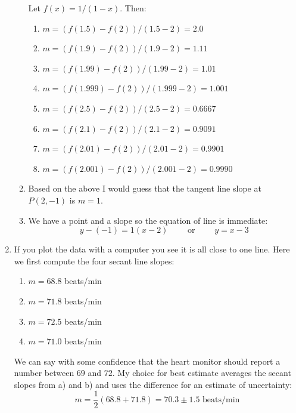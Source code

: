\documentclass[11pt]{amsart}
\begin{document}
\begin{enumerate}
\begin{enumerate}
    Let $f(x) = 1/(1-x)$.  Then:
        \renewcommand{\labelenumiii}{(\roman{enumiii})}
        \begin{enumerate}
        \item $m = (f(1.5) - f(2)) / (1.5 - 2) = 2.0$
        \item $m = (f(1.9) - f(2)) / (1.9 - 2) = 1.11$
        \item $m = (f(1.99) - f(2)) / (1.99 - 2) = 1.01$
        \item $m = (f(1.999) - f(2)) / (1.999 - 2) = 1.001$
        \item $m = (f(2.5) - f(2)) / (2.5 - 2) = 0.6667$
        \item $m = (f(2.1) - f(2)) / (2.1 - 2) = 0.9091$
        \item $m = (f(2.01) - f(2)) / (2.01 - 2) = 0.9901$
        \item $m = (f(2.001) - f(2)) / (2.001 - 2) = 0.9990$
        \end{enumerate}
    \item Based on the above I would guess that the tangent line slope at $P(2,-1)$ is $m=1$.
    \item We have a point and a slope so the equation of line is immediate:
        $$y - (-1) = 1 (x - 2) \qquad \text{ or } \qquad y = x -3$$
    \end{enumerate}

\item  If you plot the data with a computer you see it is all close to one line.  Here we first compute the four secant line slopes:

    \renewcommand{\labelenumii}{\alph{enumii})}
    \begin{enumerate}
    \item $m=68.8$ beats/min
    \item $m=71.8$ beats/min
    \item $m=72.5$ beats/min
    \item $m=71.0$ beats/min
    \end{enumerate}

We can say with some confidence that the heart monitor should report a number between $69$ and $72$.  My choice for best estimate averages the secant slopes from a) and b) and uses the difference for an estimate of uncertainty:
    $$m = \frac{1}{2} (68.8+71.8) = 70.3 \pm 1.5 \,\,\text{beats/min}$$
\end{enumerate}
\end{document}
